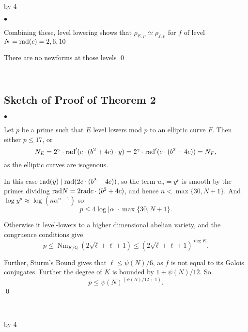 \documentclass[12pt]{scrartcl}
\newenvironment{citemize}{
\begin{list}{$\bullet$}{\setlength{\itemsep}{0pt} \setlength{\rightmargin}{0pt} \setlength{\leftmargin}{0.5\labelwidth} \setlength{\topsep}{0pt}}
}{\end{list}}
\def\Q{{\mathbb Q}}
\newcommand{\rad}{{\rm{rad}}}
\newcommand{\Nm}{\operatorname{Nm}}
\def\anzspalten{4}
\newlength{\kastenwidth}
\newenvironment{kasten}{%
  \begin{lrbox}{\dummybox}%
    \begin{minipage}{0.96\linewidth}}%
    {\end{minipage}%
  \end{lrbox}%
  \raisebox{-\depth}{\psshadowbox[framesep=1em]{\usebox{\dummybox}}}\\[0.5em]}
\newenvironment{spalte}{%
  \setlength\kastenwidth{1.2\textwidth}
  \divide\kastenwidth by \anzspalten
  \begin{minipage}[t]{\kastenwidth}}{\end{minipage}\hfill}
\begin{document}
\begin{lrbox}{\spalten}
{\begin{spalte}
\begin{kasten}
\begin{citemize}
\item Combining these, level lowering shows that $\rho_{E,p} \simeq \rho_{f,p}$ for $f$ of level $N = \rad(c) = 2,6,10$

\item There are no newforms at those levels \qed

\end{citemize}

\end{kasten}

\begin{kasten}

\subsection*{\color{blue} Sketch of Proof of Theorem 2}

\begin{citemize}

\item Let $p$ be a prime such that $E$ level lowers mod $p$ to an elliptic curve $F$.  Then either $p \leq 17$, or
\[ N_E = 2^\gamma \cdot \rad'(c \cdot (b^2+4c)\cdot y) = 2^\gamma \cdot \rad'(c \cdot (b^2+4c)) = N_F, \]
as the elliptic curves are isogenous.

\item In this case $\rad(y) \mid \rad(2c \cdot (b^2+4c))$, so the term $u_n = y^p$ is smooth by the primes dividing $\rad{N} = 2\rad{c\cdot (b^2+4c)}$, and hence $n < \max\{30, N+1\}$.  And $\log y^p \approx \log(n \alpha^{n-1})$ so
\[p \leq 4 \log |\alpha| \cdot \max\{30, N+1\}. \]

\item Otherwise it level-lowers to a higher dimensional abelian variety, and the congruence conditions give
\[ p \leq \Nm_{K/\Q}(2\sqrt{\ell} +\ell+1) \leq (2\sqrt{\ell} +\ell+1)^{\operatorname{deg}{K}}.\]

\item Further, Sturm's Bound gives that $\ell \leq \psi(N)/6$, as $f$ is not equal to its Galois conjugates.  Further the degree of $K$ is bounded by $1+\psi(N)/12$.  So
\[p \leq \psi(N)^{(\psi(N)/12+1)}.\]
\qed
\end{citemize}

\end{kasten}



\end{spalte}
    \begin{spalte}
\vspace{-2.71in}





\end{spalte}}
\end{lrbox}
\end{document}
